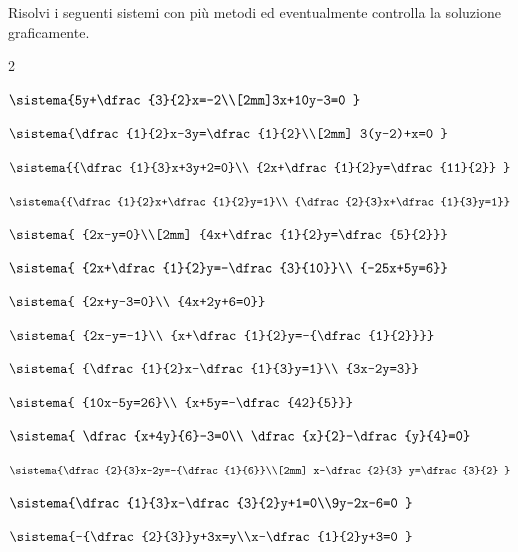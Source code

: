 \begin{esercizio}[*]
 \label{ese:22.71}
 Risolvi i seguenti sistemi con più metodi ed eventualmente controlla
la soluzione graficamente.
\begin{htmulticols}{2}
\begin{enumeratea}
\item 
\(\sistema{5y+\dfrac{3}{2}x=-2\\[2mm]3x+10y-3=0 
}\)
\item 
\(
\sistema{\dfrac{1}{2}x-3y=\dfrac{1}{2}\\[2mm]
3(y-2)+x=0 }\)
\item 
\(\sistema{{\dfrac{1}{3}x+3y+2=0}\\
{2x+\dfrac{1}{2}y=\dfrac{11}{2}}
}\)
\item 
\(\sistema{{\dfrac{1}{2}x+\dfrac{1}{2}y=1}\\
{\dfrac{2}{3}x+\dfrac{1}{3}y=1}}\)
 {
\item 
\(\sistema{
{2x-y=0}\\[2mm]
{4x+\dfrac{1}{2}y=\dfrac{5}{2}}}\)
\item \(\sistema{
{2x+\dfrac{1}{2}y=-\dfrac{3}{10}}\\
{-25x+5y=6}}\)
\item \(\sistema{
{2x+y-3=0}\\
{4x+2y+6=0}}\)
\item \(\sistema{
{2x-y=-1}\\
{x+\dfrac{1}{2}y=-{\dfrac{1}{2}}}}\)
\item \(\sistema{
{\dfrac{1}{2}x-\dfrac{1}{3}y=1}\\
{3x-2y=3}}\)
\sol{\emptyset}
\item \(\sistema{
{10x-5y=26}\\
{x+5y=-\dfrac{42}{5}}}\)
\item \(\sistema{
\dfrac{x+4y}{6}-3=0\\
\dfrac{x}{2}-\dfrac{y}{4}=0}\)
 }
{
\item 
\(\sistema{\dfrac{2}{3}x-2y=-{\dfrac{1}{6}}\\[2mm]
x-\dfrac{2}{3} y=\dfrac{3}{2} }\)
\item \(\sistema{\dfrac{1}{3}x-\dfrac{3}{2}y+1=0\\9y-2x-6=0 
}\)
\item \(\sistema{-{\dfrac{2}{3}}y+3x=y\\x-\dfrac{1}{2}y+3=0 
}\)
 }
\end{enumeratea}
\end{htmulticols}
\end{esercizio}


